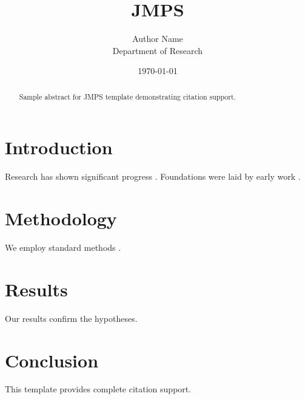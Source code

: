 ﻿\documentclass{elsarticle}
\title{JMPS}
\author{Author Name \\ \small Department of Research}
\date{\today}
\begin{document}
\maketitle

\begin{abstract}
Sample abstract for JMPS template demonstrating citation support.
\end{abstract}

\section{Introduction}
Research has shown significant progress \citep{einstein1905}. Foundations were laid by early work \citep{turing1950}.

\section{Methodology}
We employ standard methods \citep{knuth1984}.

\section{Results}
Our results confirm the hypotheses.

\section{Conclusion}
This template provides complete citation support.



\end{document}
